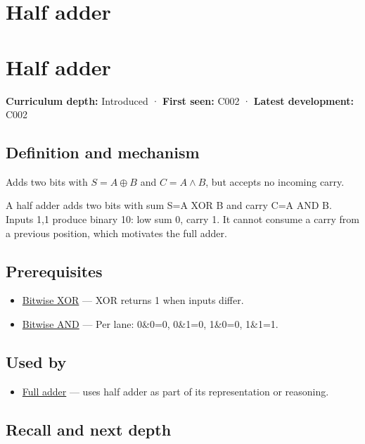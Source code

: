 \hypertarget{appendix-1652d27a8e90}{}
\section*{Half adder}
\section{Half adder}\label{appendix-1652d27a8e90-half-adder}

\textbf{Curriculum depth:} Introduced · \textbf{First seen:} C002 · \textbf{Latest development:} C002

\subsection{Definition and mechanism}\label{appendix-1652d27a8e90-definition-and-mechanism}

Adds two bits with \(S=A\oplus B\) and \(C=A\land B\), but accepts no incoming carry.

A half adder adds two bits with sum S=A XOR B and carry C=A AND B. Inputs 1,1 produce binary 10: low sum 0, carry 1. It cannot consume a carry from a previous position, which motivates the full adder.

\subsection{Prerequisites}\label{appendix-1652d27a8e90-prerequisites}

\begin{itemize}
\tightlist
\item
  \hyperref[appendix-d49161831368]{Bitwise XOR} --- XOR returns 1 when inputs differ.
\item
  \hyperref[appendix-68b52453737c]{Bitwise AND} --- Per lane: 0\&0=0, 0\&1=0, 1\&0=0, 1\&1=1.
\end{itemize}

\subsection{Used by}\label{appendix-1652d27a8e90-used-by}

\begin{itemize}
\tightlist
\item
  \hyperref[appendix-d1a5b1e520c2]{Full adder} --- uses half adder as part of its representation or reasoning.
\end{itemize}

\subsection{Recall and next depth}\label{appendix-1652d27a8e90-recall-and-next-depth}

